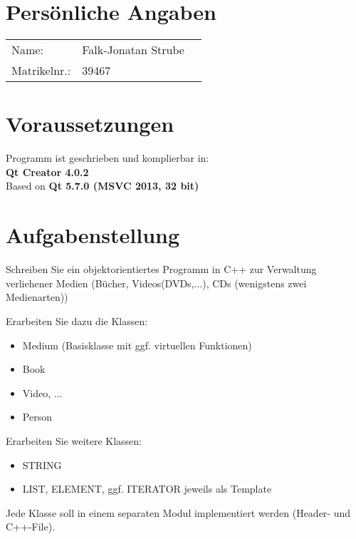 

\DNotiz{}
\renewcommand{\workingdir}{../../}
\renewcommand{\Dokumentensignatur}{}
\renewcommand{\Autorformat}[1]{\textcolor{darkgray}{#1}}



\maketitle
\newpage

\section*{Persönliche Angaben}
\begin{tabular}{l l l}
Name: 					&Falk-Jonatan Strube\\
Matrikelnr.:		&39467\\
\end{tabular}

\section*{Voraussetzungen}
Programm ist geschrieben und komplierbar in:\\
\textbf{Qt Creator 4.0.2}\\
Based on \textbf{Qt 5.7.0 (MSVC 2013, 32 bit)}

\section*{Aufgabenstellung}
Schreiben Sie ein objektorientiertes Programm in C++ zur Verwaltung verliehener Medien (Bücher, Videos(DVDs,...), CDs (wenigstens zwei Medienarten))

Erarbeiten Sie dazu die Klassen:
\begin{itemize}
\item Medium (Basisklasse mit ggf. virtuellen Funktionen)
\item Book
\item Video, ...
\item Person
\end{itemize}
Erarbeiten Sie weitere Klassen:
\begin{itemize}
\item STRING
\item LIST, ELEMENT, ggf. ITERATOR jeweils als Template
\end{itemize}
Jede Klasse soll in einem separaten Modul implementiert werden (Header- und C++-File).

